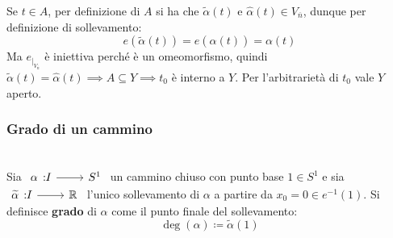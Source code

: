 \begin{demonstration}
\begin{itemize}
	Se $t\in A$, per definizione di $A$ si ha che $\widetilde{\alpha}(t)$ e $\widehat{\alpha}(t)\in V_{\overline{n}}$, dunque per definizione di sollevamento:
	\begin{equation*}
		e\left( \widetilde{\alpha}(t) \right)= e\left( \widehat{\alpha}(t) \right)= \alpha(t)
	\end{equation*}
	Ma $e_{\mid_{V_{\overline{n}}}}$ è iniettiva perché è un omeomorfismo, quindi $\widetilde{\alpha}(t)=\widehat{\alpha}(t) \implies A\subseteq Y \implies t_0$ è interno a $Y$. Per l'arbitrarietà di $t_0$ vale $Y$ aperto.
	\end{itemize}
\vspace{-3mm}
\end{demonstration}

\subsubsection{Grado di un cammino}
\begin{define}~{}\\
	Sia $\funz \alpha I {S^1}$ un cammino chiuso con punto base $1\in S^1$ e sia $\funz {\widetilde{\alpha}} I \realset$ l'unico sollevamento di $\alpha$ a partire da $x_0=0 \in e^{-1} (1)$. Si definisce \textbf{grado} di $\alpha$ come il punto finale del sollevamento:
	\begin{equation}
		\deg (\alpha)\coloneqq \widetilde{\alpha}(1)
	\end{equation}
\vspace{-6mm}
\end{define}

